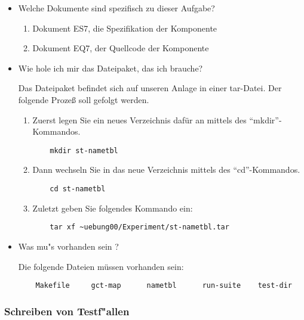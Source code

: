 \begin{itemize}

\item Welche Dokumente sind spezifisch zu dieser Aufgabe?

\begin{enumerate}
\item Dokument ES7, die Spezifikation der Komponente
\item Dokument EQ7, der Quellcode der Komponente
\end{enumerate}

\item Wie hole ich mir das Dateipaket, das ich brauche?

Das Dateipaket befindet sich auf unseren Anlage in einer tar-Datei.
Der folgende Proze{\ss} soll gefolgt werden.

\begin{enumerate}

\item Zuerst legen Sie ein neues Verzeichnis daf\"ur an mittels des 
"`mkdir"'-Kommandos.
\begin{verbatim}
    mkdir st-nametbl
\end{verbatim}

\item Dann wechseln Sie in das neue Verzeichnis mittels des 
"`cd"'-Kommandos.
\begin{verbatim}
    cd st-nametbl
\end{verbatim}

\item Zuletzt geben Sie folgendes Kommando ein:
\begin{verbatim}
    tar xf ~uebung00/Experiment/st-nametbl.tar
\end{verbatim}

\end{enumerate}

\item Was mu"s vorhanden sein ?

Die folgende Dateien m\"ussen vorhanden sein:
\begin{verbatim}
    Makefile     gct-map      nametbl      run-suite    test-dir
\end{verbatim}

\end{itemize}


\subsubsection*{Schreiben von Testf"allen}


